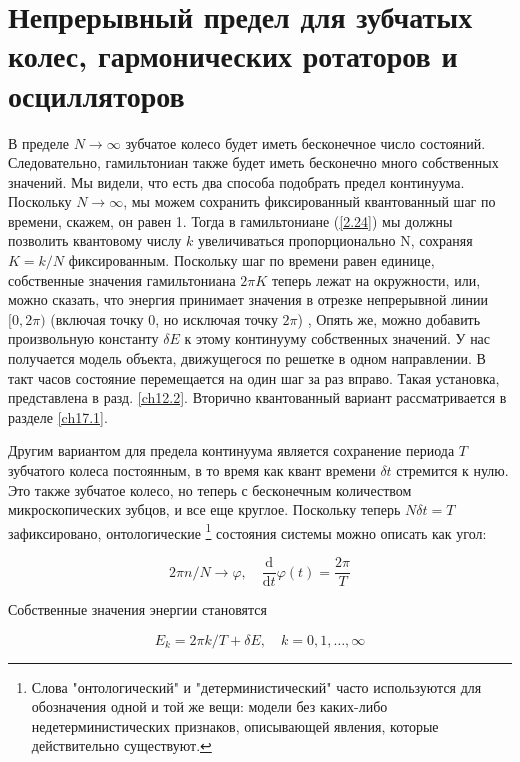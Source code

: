 \documentclass[main.tex]{subfiles}
\begin{document}
\section{Непрерывный  предел для зубчатых колес, гармонических ротаторов и осцилляторов}\label{ch13}

В пределе $N\rightarrow \infty$ зубчатое колесо будет иметь бесконечное число состояний. Следовательно, гамильтониан также будет иметь бесконечно много собственных значений. Мы видели, что есть два способа подобрать предел континуума. Поскольку $N\rightarrow \infty$, мы можем сохранить фиксированный квантованный шаг по времени, скажем, он равен 1. Тогда в гамильтониане (\ref{2.24}) мы должны позволить квантовому числу $k$ увеличиваться пропорционально N, сохраняя $K = k / N$ фиксированным. Поскольку шаг по времени равен единице, собственные значения гамильтониана $2\pi K$ теперь лежат на окружности, или, можно сказать, что энергия принимает значения в отрезке непрерывной линии $[0,2\pi)$ (включая точку 0, но исключая точку $2\pi$) , Опять же, можно добавить произвольную константу $\delta E$ к этому континууму собственных значений. У нас получается модель объекта, движущегося по решетке в одном направлении. В такт часов состояние перемещается на один шаг за раз вправо. Такая установка, представлена в разд. \ref{ch12.2}. Вторично квантованный вариант рассматривается в разделе \ref{ch17.1}.

Другим вариантом для предела континуума является сохранение периода $T$ зубчатого колеса постоянным, в то время как квант времени $\delta t$ стремится к нулю. Это также зубчатое колесо, но теперь с бесконечным количеством микроскопических зубцов, и все еще круглое. Поскольку теперь $N\delta t = T$ зафиксировано, онтологические \footnote{Слова "онтологический" и "детерминистический" часто используются для обозначения одной и той же вещи: модели без каких-либо недетерминистических признаков, описывающей явления, которые действительно существуют.} состояния системы можно описать как угол:

\begin{equation}\label{13.1}
	2 \pi n / N \rightarrow \varphi, \quad \frac{\mathrm{d}}{\mathrm{d} t} \varphi(t)=\frac{2 \pi}{T}
\end{equation}

Собственные значения энергии становятся

\begin{equation}\label{13.2}
	E_{k}=2 \pi k / T+\delta E, \quad k=0,1, \ldots, \infty
\end{equation}
\end{document}
